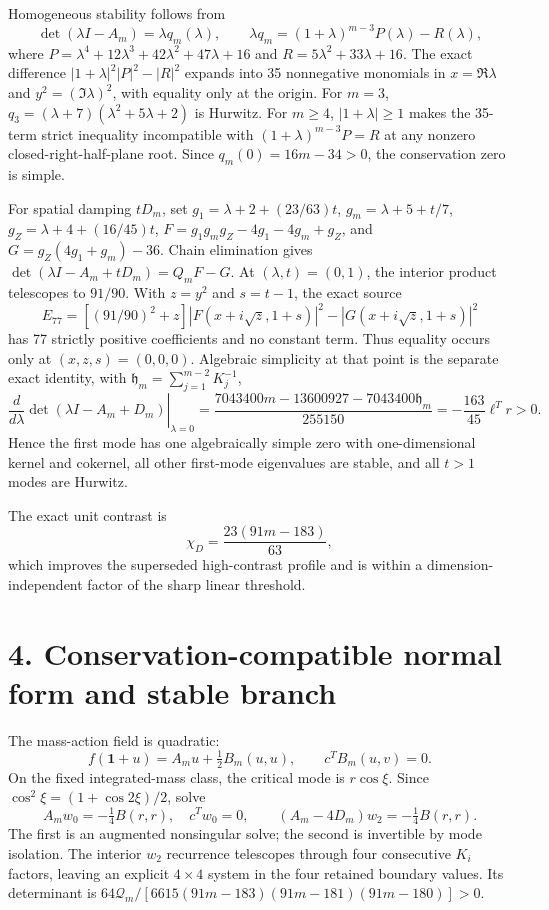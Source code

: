 \documentclass[10pt]{article}
\begin{document}
Homogeneous stability follows from
\[
\det(\lambda I-A_m)=\lambda q_m(\lambda),\qquad
\lambda q_m=(1+\lambda)^{m-3}P(\lambda)-R(\lambda),
\]
where $P=\lambda^4+12\lambda^3+42\lambda^2+47\lambda+16$ and $R=5\lambda^2+33\lambda+16$. The exact difference $|1+\lambda|^2|P|^2-|R|^2$ expands into 35 nonnegative monomials in $x=\Re\lambda$ and $y^2=(\Im\lambda)^2$, with equality only at the origin.
For $m=3$, $q_3=(\lambda+7)(\lambda^2+5\lambda+2)$ is Hurwitz.  For
$m\ge4$, $|1+\lambda|\ge1$ makes the 35-term strict inequality incompatible
with $(1+\lambda)^{m-3}P=R$ at any nonzero closed-right-half-plane root.
Since $q_m(0)=16m-34>0$, the conservation zero is simple.

For spatial damping $tD_m$, set
$g_1=\lambda+2+(23/63)t$, $g_m=\lambda+5+t/7$,
$g_Z=\lambda+4+(16/45)t$,
$F=g_1g_mg_Z-4g_1-4g_m+g_Z$, and $G=g_Z(4g_1+g_m)-36$.
Chain elimination gives $\det(\lambda I-A_m+tD_m)=Q_mF-G$.
At $(\lambda,t)=(0,1)$, the interior
product telescopes to $91/90$.  With $z=y^2$ and $s=t-1$, the exact source
\[
E_{77}=\left[(91/90)^2+z\right]|F(x+i\sqrt z,1+s)|^2
-|G(x+i\sqrt z,1+s)|^2
\]
has 77 strictly positive coefficients and no constant term.  Thus equality
occurs only at $(x,z,s)=(0,0,0)$.  Algebraic simplicity at that point is the
separate exact identity, with
$\mathfrak h_m=\sum_{j=1}^{m-2}K_j^{-1}$,
\[
 \left.\frac{d}{d\lambda}\det(\lambda I-A_m+D_m)\right|_{\lambda=0}
 =\frac{7043400m-13600927-7043400\mathfrak h_m}{255150}
 =-\frac{163}{45}\ell^Tr>0.
\]
Hence the first mode has one algebraically simple zero with one-dimensional
kernel and cokernel, all other first-mode eigenvalues are stable, and all
$t>1$ modes are Hurwitz.

The exact unit contrast is
\[
\chi_D=\frac{23(91m-183)}{63},
\]
which improves the superseded high-contrast profile and is within a dimension-independent factor of the sharp linear threshold.

\newpage
\section*{4. Conservation-compatible normal form and stable branch}
The mass-action field is quadratic:
\[
f(\mathbf1+u)=A_mu+\tfrac12B_m(u,u),\qquad c^TB_m(u,v)=0.
\]
On the fixed integrated-mass class, the critical mode is $r\cos\xi$. Since $\cos^2\xi=(1+\cos2\xi)/2$, solve
\[
A_mw_0=-\tfrac14B(r,r),\quad c^Tw_0=0,
\qquad (A_m-4D_m)w_2=-\tfrac14B(r,r).
\]
The first is an augmented nonsingular solve; the second is invertible by mode
isolation.  The interior $w_2$ recurrence telescopes through four consecutive
$K_i$ factors, leaving an explicit $4\times4$ system in the four retained
boundary values.  Its determinant is
$64\mathcal Q_m/[6615(91m-183)(91m-181)(91m-180)]>0$.
\end{document}
